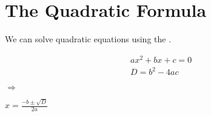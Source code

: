 \section{The Quadratic Formula}

We can solve quadratic equations using 
the  .

\vspace{-1\onelineskip}
\hfill
\begin{minipage}{0.3\textwidth}
    \raggedleft
    \normalsize
    \begin{align*}
        &ax^2 + bx + c = 0 \\ 
        &D = b^2 - 4ac
    \end{align*}
\end{minipage}
\hfill
{
    \huge $\Rightarrow$
}
\hfill
\begin{minipage}{0.3\textwidth}
    \raggedright
    \large
    \(
        x = \frac
            {-b \pm \sqrt{D}}
            {2a}
    \)
\end{minipage}
\hfill\,
